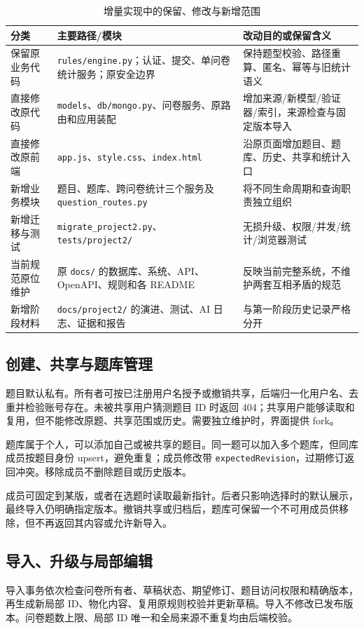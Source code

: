 \documentclass[UTF8,10pt,a4paper,twocolumn,fontset=none]{ctexart}
\begin{document}
\begin{table}[t]
\centering\small
\caption{增量实现中的保留、修改与新增范围}
\label{tab:changes}
\begin{tabularx}{\textwidth}{@{}p{28mm}p{66mm}Y@{}}
\toprule 分类 & 主要路径/模块 & 改动目的或保留含义\\\midrule
保留原业务代码 & \texttt{rules/engine.py}；认证、提交、单问卷统计服务；原安全边界 & 保持题型校验、路径重算、匿名、幂等与旧统计语义\\
直接修改原代码 & \texttt{models}、\texttt{db/mongo.py}、问卷服务、原路由和应用装配 & 增加来源/新模型/验证器/索引，来源检查与固定版本导入\\
直接修改原前端 & \texttt{app.js}、\texttt{style.css}、\texttt{index.html} & 沿原页面增加题目、题库、历史、共享和统计入口\\
新增业务模块 & 题目、题库、跨问卷统计三个服务及 \texttt{question\_routes.py} & 将不同生命周期和查询职责独立组织\\
新增迁移与测试 & \texttt{migrate\_project2.py}、\texttt{tests/project2/} & 无损升级、权限/并发/统计/浏览器测试\\
当前规范原位维护 & 原 \texttt{docs/} 的数据库、系统、API、OpenAPI、规则和各 README & 反映当前完整系统，不维护两套互相矛盾的规范\\
新增阶段材料 & \texttt{docs/project2/} 的演进、测试、AI 日志、证据和报告 & 与第一阶段历史记录严格分开\\\bottomrule
\end{tabularx}
\end{table}

\subsection{创建、共享与题库管理}
题目默认私有。所有者可按已注册用户名授予或撤销共享，后端归一化用户名、去重并检验账号存在。未被共享用户猜测题目 ID 时返回 404；共享用户能够读取和复用，但不能修改原题、共享范围或历史。需要独立维护时，界面提供 fork。

题库属于个人，可以添加自己或被共享的题目。同一题可以加入多个题库，但同库成员按题目身份 upsert，避免重复；成员修改带 \texttt{expectedRevision}，过期修订返回冲突。移除成员不删除题目或历史版本。

成员可固定到某版，或者在选题时读取最新指针。后者只影响选择时的默认展示，最终导入仍明确指定版本。撤销共享或归档后，题库可保留一个不可用成员供移除，但不再返回其内容或允许新导入。

\subsection{导入、升级与局部编辑}
导入事务依次检查问卷所有者、草稿状态、期望修订、题目访问权限和精确版本，再生成新局部 ID、物化内容、复用原规则校验并更新草稿。导入不修改已发布版本。问卷题数上限、局部 ID 唯一和全局来源不重复均由后端校验。
\end{document}
